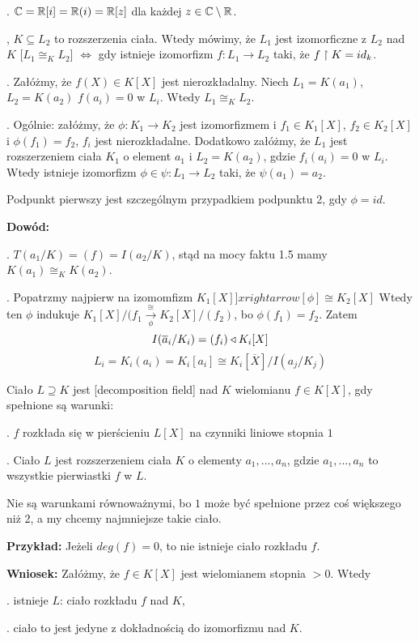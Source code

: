 . $\mathbb{C}=\mathbb{R}[i]=\mathbb{R}(i)=\mathbb{R}[z]$ dla każdej $z\in \mathbb{C}\setminus\mathbb{R}$.

, $K\subseteq L_2$ to rozszerzenia ciała. Wtedy mówimy, że $L_1$ jest izomorficzne z $L_2$ nad $K$ [$L_1\cong_K L_2$] $\iff$ gdy istnieje izomorfizm $f:L_1\to L_2$ taki, że $f\upharpoonright K=id_k$.


. Załóżmy, że $f(X)\in K[X]$ jest nierozkładalny. Niech $L_1=K(a_1)$, $L_2=K(a_2)$ $f(a_i)=0$ w $L_i$. Wtedy $L_1\cong_K L_2$.

. Ogólnie: załóżmy, że $\phi:K_1\to K_2$ jest izomorfizmem i $f_1\in K_1[X]$, $f_2\in K_2[X]$ i $\phi(f_1)=f_2$, $f_i$ jest nierozkładalne. Dodatkowo załóżmy, że $L_1$ jest rozszerzeniem ciała $K_1$ o element $a_1$ i $L_2=K(a_2)$, gdzie $f_i(a_i)=0$ w $L_i$. Wtedy istnieje izomorfizm $\phi\in \psi:L_1\to L_2$ taki, że $\psi(a_1)=a_2$.

Podpunkt pierwszy jest szczególnym przypadkiem podpunktu 2, gdy $\phi=id$.

\textbf{Dowód:}

. $T(a_1/K)=(f)=I(a_2/K)$, stąd na mocy faktu 1.5 mamy $K(a_1)\cong_K K(a_2)$.

. Popatrzmy najpierw na izomomfizm $K_1[X]]xrightarrow[\phi]{\cong}K_2[X]$ Wtedy ten $\phi$ indukuje $K_1[X]/(f_1\xrightarrow[\phi]{\cong}K_2[X]/(f_2)$, bo $\phi(f_1)=f_2$. Zatem
$$I(\overline a_i/K_i)=(f_i)\triangleleft K_i[X]$$
$$L_i=K_i(a_i)=K_i[a_i]\cong K_i[\overline X]/I(a_j/K_j)$$

Ciało $L\supseteq K$ jest  [decomposition field] nad $K$ wielomianu $f\in K[X]$, gdy spełnione są warunki:

. $f$ rozkłada się w pierścieniu $L[X]$ na czynniki liniowe stopnia $1$

. Ciało $L$ jest rozszerzeniem ciała $K$ o elementy $a_1,..., a_n$, gdzie $a_1,..., a_n$ to wszystkie pierwiastki $f$ w $L$.

Nie są warunkami równoważnymi, bo $1$ może być spełnione przez coś większego niż 2, a my chcemy najmniejsze takie ciało.

\textbf{Przykład:} Jeżeli $deg(f)=0$, to nie istnieje ciało rozkładu $f$.

\textbf{Wniosek:} Załóżmy, że $f\in K[X]$ jest wielomianem stopnia $>0$. Wtedy 

. istnieje $L$: ciało rozkładu $f$ nad $K$,

. ciało to jest jedyne z dokładnością do izomorfizmu nad $K$.


